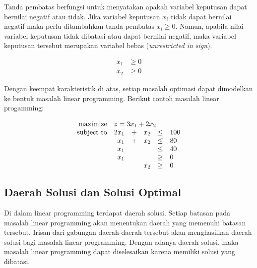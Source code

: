 \begin{itemize}
		Tanda pembatas berfungsi untuk menyatakan apakah variabel keputusan dapat bernilai negatif atau tidak. Jika variabel keputusan \(x_i\) tidak dapat bernilai negatif maka perlu ditambahkan tanda pembatas \(x_i \geq 0\). Namun, apabila nilai variabel keputusan tidak dibatasi atau dapat bernilai negatif, maka variabel keputusan tersebut merupakan variabel bebas (\textit{unrestricted in sign}).
		
		\begin{equation*}
			\begin{split}
    			x_1 &\geq 0 \\
    			x_2 &\geq 0
			\end{split}
		\end{equation*}
		
\end{itemize}

Dengan keempat karakteristik di atas, setiap masalah optimasi dapat dimodelkan ke bentuk masalah linear programming. Berikut contoh masalah linear progamming:

\begin{equation*}
	\begin{array}{r r c r c l}
		\text{maximize} &\multicolumn{5}{l}{z = 3x_1 + 2x_2}\\
		\text{subject to} &2x_1 &+ &x_2 &\leq &100\\
		&x_1 &+ &x_2 &\leq &80\\
		&x_1 &&&\leq &40\\
		&x_1 &&&\geq &0\\
		&&&x_2 &\geq &0\\
	\end{array}
\end{equation*}

\subsection{Daerah Solusi dan Solusi Optimal}
\label{daerah_solusi_dan_solusi_optimal}

Di dalam linear programming terdapat daerah solusi. Setiap batasan pada masalah linear programming akan menentukan daerah yang memenuhi batasan tersebut. Irisan dari gabungan daerah-daerah tersebut akan menghasilkan daerah solusi bagi masalah linear programming. Dengan adanya daerah solusi, maka masalah linear programming dapat diselesaikan karena memiliki solusi yang dibatasi.


